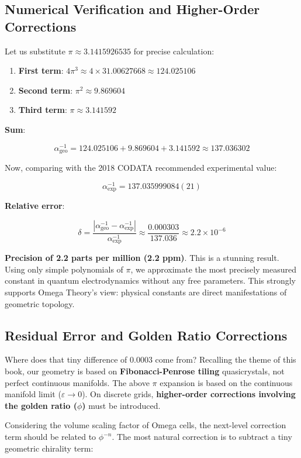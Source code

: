 \subsection{Numerical Verification and Higher-Order Corrections}

Let us substitute $\pi \approx 3.1415926535$ for precise calculation:

\begin{enumerate}
\item \textbf{First term}: $4\pi^3 \approx 4 \times 31.00627668 \approx 124.025106$
\item \textbf{Second term}: $\pi^2 \approx 9.869604$
\item \textbf{Third term}: $\pi \approx 3.141592$
\end{enumerate}

\textbf{Sum}:

\[\alpha_{\text{geo}}^{-1} = 124.025106 + 9.869604 + 3.141592 \approx 137.036302\]

Now, comparing with the 2018 CODATA recommended experimental value:

\[\alpha_{\text{exp}}^{-1} = 137.035999084(21)\]

\textbf{Relative error}:

\[\delta = \frac{|\alpha_{\text{geo}}^{-1} - \alpha_{\text{exp}}^{-1}|}{\alpha_{\text{exp}}^{-1}} \approx \frac{0.000303}{137.036} \approx 2.2 \times 10^{-6}\]

\textbf{Precision of 2.2 parts per million (2.2 ppm)}.
This is a stunning result. Using only simple polynomials of $\pi$, we approximate the most precisely measured constant in quantum electrodynamics without any free parameters. This strongly supports Omega Theory's view: physical constants are direct manifestations of geometric topology.

\subsection{Residual Error and Golden Ratio Corrections}

Where does that tiny difference of $0.0003$ come from?
Recalling the theme of this book, our geometry is based on \textbf{Fibonacci-Penrose tiling} quasicrystals, not perfect continuous manifolds. The above $\pi$ expansion is based on the continuous manifold limit ($\varepsilon \to 0$).
On discrete grids, \textbf{higher-order corrections involving the golden ratio ($\phi$)} must be introduced.

Considering the volume scaling factor of Omega cells, the next-level correction term should be related to $\phi^{-n}$.
The most natural correction is to subtract a tiny geometric chirality term:

